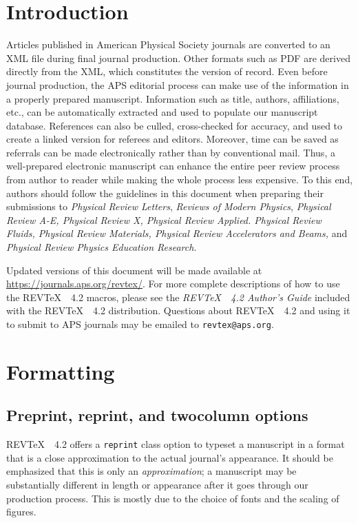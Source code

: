 \documentclass[twocolumn,secnumarabic,amssymb, nobibnotes, aps, prd]{revtex4-2}
\newcommand{\revtex}{REV\TeX\ }
\newcommand{\classoption}[1]{\texttt{#1}}
\begin{document}
\maketitle
\tableofcontents

\section{Introduction}
Articles published in American Physical Society journals are converted to 
an XML file during final journal production. Other formats such
as PDF are derived directly from the XML, which constitutes the version of record. 
Even before journal production, the APS editorial process can make use
of the information in a properly prepared manuscript. Information such
as title, authors, affiliations, etc., can be automatically
extracted and used to populate our manuscript database. References can
also be culled, cross-checked for accuracy, and used to create a
linked version for referees and editors. Moreover, time can be saved
as referrals can be made electronically rather than by conventional
mail. Thus, a well-prepared electronic manuscript can enhance the
entire peer review process from author to reader while making the
whole process less expensive. To this end, authors should follow the
guidelines in this document when preparing their submissions to \textit{Physical Review Letters},
 \textit{Reviews of Modern Physics},  \textit{Physical Review A-E, Physical Review X, Physical Review Applied. Physical Review Fluids, Physical Review Materials, Physical Review Accelerators and Beams,} and \textit{Physical Review Physics Education Research}.
 
Updated versions of this document will be made available at  \url{https://journals.aps.org/revtex/}. For more complete
descriptions of how to use the \revtex\ 4.2 macros, please see the
\textit{\revtex~4.2 Author's Guide} included with the \revtex~4.2
distribution. Questions about \revtex\ 4.2 and using it to submit to APS journals may be
emailed to \texttt{revtex@aps.org}.

\section{Formatting}
\subsection{Preprint, reprint, and twocolumn options}
\revtex~4.2 offers a \classoption{reprint} class option to typeset a manuscript
in a format that is a close approximation to the actual journal's appearance. It should
be emphasized that this is only an \textit{approximation}; a manuscript may be substantially different
in length or appearance after it goes through our production process. This is mostly due to the choice
of fonts and the scaling of figures.
\end{document}
